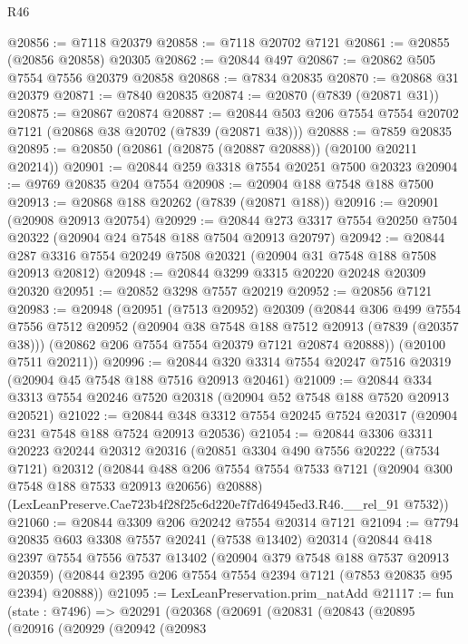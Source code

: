 \begin{lexlean}{R46}
\begin{coremodule}
@20856 := @7118 @20379
@20858 := @7118 @20702 @7121
@20861 := @20855 (@20856 @20858) @20305
@20862 := @20844 @497
@20867 := @20862 @505 @7554 @7556 @20379 @20858
@20868 := @7834 @20835
@20870 := @20868 @31 @20379
@20871 := @7840 @20835
@20874 := @20870 (@7839 (@20871 @31))
@20875 := @20867 @20874
@20887 := @20844 @503 @206 @7554 @7554 @20702 @7121 (@20868 @38 @20702 (@7839 (@20871 @38)))
@20888 := @7859 @20835
@20895 := @20850 (@20861 (@20875 (@20887 @20888)) (@20100 @20211 @20214))
@20901 := @20844 @259 @3318 @7554 @20251 @7500 @20323
@20904 := @9769 @20835 @204 @7554
@20908 := @20904 @188 @7548 @188 @7500
@20913 := @20868 @188 @20262 (@7839 (@20871 @188))
@20916 := @20901 (@20908 @20913 @20754)
@20929 := @20844 @273 @3317 @7554 @20250 @7504 @20322 (@20904 @24 @7548 @188 @7504 @20913 @20797)
@20942 := @20844 @287 @3316 @7554 @20249 @7508 @20321 (@20904 @31 @7548 @188 @7508 @20913 @20812)
@20948 := @20844 @3299 @3315 @20220 @20248 @20309 @20320
@20951 := @20852 @3298 @7557 @20219
@20952 := @20856 @7121
@20983 := @20948
    (@20951
      (@7513 @20952)
      @20309
      (@20844
        @306
        @499
        @7554
        @7556
        @7512
        @20952
        (@20904 @38 @7548 @188 @7512 @20913 (@7839 (@20357 @38)))
        (@20862 @206 @7554 @7554 @20379 @7121 @20874 @20888))
      (@20100 @7511 @20211))
@20996 := @20844 @320 @3314 @7554 @20247 @7516 @20319 (@20904 @45 @7548 @188 @7516 @20913 @20461)
@21009 := @20844 @334 @3313 @7554 @20246 @7520 @20318 (@20904 @52 @7548 @188 @7520 @20913 @20521)
@21022 := @20844 @348 @3312 @7554 @20245 @7524 @20317 (@20904 @231 @7548 @188 @7524 @20913 @20536)
@21054 := @20844
    @3306
    @3311
    @20223
    @20244
    @20312
    @20316
    (@20851
      @3304
      @490
      @7556
      @20222
      (@7534 @7121)
      @20312
      (@20844 @488 @206 @7554 @7554 @7533 @7121 (@20904 @300 @7548 @188 @7533 @20913 @20656) @20888)
      (LexLeanPreserve.Cae723b4f28f25c6d220e7f7d64945ed3.R46.__rel_91 @7532))
@21060 := @20844 @3309 @206 @20242 @7554 @20314 @7121
@21094 := @7794
    @20835
    @603
    @3308
    @7557
    @20241
    (@7538 @13402)
    @20314
    (@20844
      @418
      @2397
      @7554
      @7556
      @7537
      @13402
      (@20904 @379 @7548 @188 @7537 @20913 @20359)
      (@20844 @2395 @206 @7554 @7554 @2394 @7121 (@7853 @20835 @95 @2394) @20888))
@21095 := LexLeanPreservation.prim_natAdd
@21117 := fun (state : @7496) =>
  @20291
    (@20368
      (@20691
        (@20831
          (@20843
            (@20895
              (@20916
                (@20929
                  (@20942
                    (@20983

\end{coremodule}
\end{lexlean}
